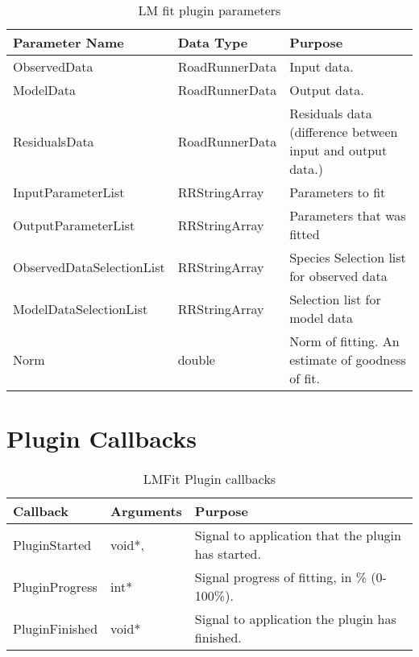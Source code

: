 \begin{table}[ht]
\centering %
\begin{tabular}{l l p{7.5cm}} %

Parameter Name & Data Type & Purpose \\ [0.5ex] %
\hline %
ObservedData   				& 	RoadRunnerData 		& 	Input data.  \\
ModelData      				& 	RoadRunnerData    	& 	Output data. \\
ResidualsData  				& 	RoadRunnerData    	& 	Residuals data (difference between input and output data.) \\
InputParameterList 			&	RRStringArray		& 	Parameters to fit \\
OutputParameterList 		&   RRStringArray   	& 	Parameters that was fitted \\
ObservedDataSelectionList 	& 	RRStringArray		&	Species Selection list for observed data \\
ModelDataSelectionList 		& 	RRStringArray		&	Selection list for model data \\
Norm						&	double				& 	Norm of fitting. An estimate of goodness of fit. \\

\hline %
\end{tabular}
\caption{LM fit plugin parameters} 
\label{table:lmfitPluginParameters} 
\end{table}

\section{Plugin Callbacks}
\begin{table}[ht]
\centering %
\begin{tabular}{l l p{7.5cm}} %

Callback & Arguments & Purpose \\ [0.5ex] %
\hline %
PluginStarted  	& 	void*, & Signal to application that the plugin has started. \\
PluginProgress	& 	int*  & Signal progress of fitting, in \% (0-100\%). \\
PluginFinished	& 	void* & Signal to application the plugin has finished. \\

\hline %
\end{tabular}
\caption{LMFit Plugin callbacks} 
\label{table:lmfitPluginCallBacks} 
\end{table}

